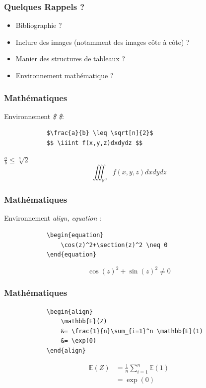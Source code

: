 \documentclass[handout]{beamer}
\begin{document}
	\begin{frame}
		\frametitle{Quelques Rappels ?}
		\begin{itemize}
			\item Bibliographie ?
			\item Inclure des images (notamment des images côte à côte) ?
			\item Manier des structures de tableaux ?
			\item Environnement mathématique ?
		\end{itemize}
	\end{frame}

	\begin{frame}[fragile=singleslide]
		\frametitle{Mathématiques}

		\centering
		Environnement \textit{\$ \$}:
		\begin{verbatim}
			$\frac{a}{b} \leq \sqrt[n]{2}$
			$$ \iiint f(x,y,z)dxdydz $$
		\end{verbatim}

		$\frac{a}{b} \leq \sqrt[n]{2}$
		$$ \iiint_{\mathbb{R^3}} f(x,y,z)dxdydz $$

	\end{frame}

	\begin{frame}[fragile=singleslide]
		\frametitle{Mathématiques}
		\centering
		Environnement \textit{align, equation} :
		\begin{verbatim}
			\begin{equation}
				\cos(z)^2+\section(z)^2 \neq 0
			\end{equation}
		\end{verbatim}

		\begin{equation}
			\cos(z)^2+\sin(z)^2 \neq 0
		\end{equation}


	\end{frame}

	\begin{frame}[fragile=singleslide]
		\frametitle{Mathématiques}
		\centering
		\begin{verbatim}
			\begin{align}
				\mathbb{E}(Z)
				&= \frac{1}{n}\sum_{i=1}^n \mathbb{E}(1)
				&= \exp(0)
			\end{align}
		\end{verbatim}

		\begin{align}
			\mathbb{E}(Z)
			&= \frac{1}{n}\sum_{i=1}^n \mathbb{E}(1)\\
			&= \exp(0)
		\end{align}

	\end{frame}
\end{document}
